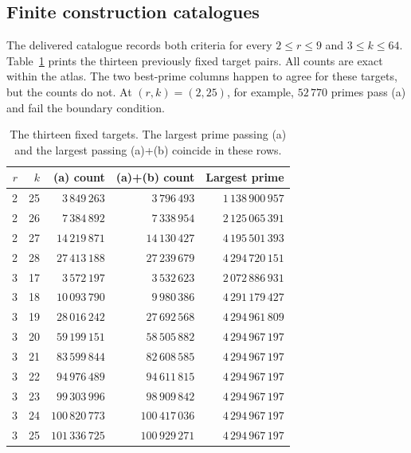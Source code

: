 \documentclass[11pt]{article}
\theoremstyle{definition}\newtheorem{definition}[theorem]{Definition}
\begin{document}
\subsection{Finite construction catalogues}
The delivered catalogue records both criteria for every $2\le r\le9$
and $3\le k\le64$. Table~\ref{tab:targets} prints the thirteen
previously fixed target pairs. All counts are exact within the atlas.
The two best-prime columns happen to agree for these targets, but the
counts do not. At $(r,k)=(2,25)$, for example, $52\,770$ primes pass
(a) and fail the boundary condition.
\begin{table}[htbp]\centering\small\setlength{\tabcolsep}{4pt}
\caption{The thirteen fixed targets. The largest prime passing (a) and the largest passing (a)+(b) coincide in these rows.}\label{tab:targets}
\begin{tabular}{rrrrr}
\toprule
$r$ & $k$ & (a) count & (a)+(b) count & Largest prime \\
\midrule
2 & 25 & $3\,849\,263$ & $3\,796\,493$ & $1\,138\,900\,957$ \\
2 & 26 & $7\,384\,892$ & $7\,338\,954$ & $2\,125\,065\,391$ \\
2 & 27 & $14\,219\,871$ & $14\,130\,427$ & $4\,195\,501\,393$ \\
2 & 28 & $27\,413\,188$ & $27\,239\,679$ & $4\,294\,720\,151$ \\
3 & 17 & $3\,572\,197$ & $3\,532\,623$ & $2\,072\,886\,931$ \\
3 & 18 & $10\,093\,790$ & $9\,980\,386$ & $4\,291\,179\,427$ \\
3 & 19 & $28\,016\,242$ & $27\,692\,568$ & $4\,294\,961\,809$ \\
3 & 20 & $59\,199\,151$ & $58\,505\,882$ & $4\,294\,967\,197$ \\
3 & 21 & $83\,599\,844$ & $82\,608\,585$ & $4\,294\,967\,197$ \\
3 & 22 & $94\,976\,489$ & $94\,611\,815$ & $4\,294\,967\,197$ \\
3 & 23 & $99\,303\,996$ & $98\,909\,842$ & $4\,294\,967\,197$ \\
3 & 24 & $100\,820\,773$ & $100\,417\,036$ & $4\,294\,967\,197$ \\
3 & 25 & $101\,336\,725$ & $100\,929\,271$ & $4\,294\,967\,197$ \\
\bottomrule\end{tabular}\end{table}
\end{document}
